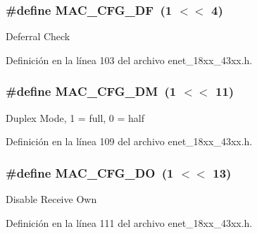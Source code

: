 \subsubsection[{\texorpdfstring{M\+A\+C\+\_\+\+C\+F\+G\+\_\+\+DF}{MAC_CFG_DF}}]{\setlength{\rightskip}{0pt plus 5cm}\#define M\+A\+C\+\_\+\+C\+F\+G\+\_\+\+DF~(1 $<$$<$ 4)}\hypertarget{group___e_n_e_t__18_x_x__43_x_x_ga76e80594820118f47b7084cbcf46e82d}{}\label{group___e_n_e_t__18_x_x__43_x_x_ga76e80594820118f47b7084cbcf46e82d}
Deferral Check 

Definición en la línea 103 del archivo enet\+\_\+18xx\+\_\+43xx.\+h.

\subsubsection[{\texorpdfstring{M\+A\+C\+\_\+\+C\+F\+G\+\_\+\+DM}{MAC_CFG_DM}}]{\setlength{\rightskip}{0pt plus 5cm}\#define M\+A\+C\+\_\+\+C\+F\+G\+\_\+\+DM~(1 $<$$<$ 11)}\hypertarget{group___e_n_e_t__18_x_x__43_x_x_ga88f18b0bf9c694534e3616971de33f74}{}\label{group___e_n_e_t__18_x_x__43_x_x_ga88f18b0bf9c694534e3616971de33f74}
Duplex Mode, 1 = full, 0 = half 

Definición en la línea 109 del archivo enet\+\_\+18xx\+\_\+43xx.\+h.

\subsubsection[{\texorpdfstring{M\+A\+C\+\_\+\+C\+F\+G\+\_\+\+DO}{MAC_CFG_DO}}]{\setlength{\rightskip}{0pt plus 5cm}\#define M\+A\+C\+\_\+\+C\+F\+G\+\_\+\+DO~(1 $<$$<$ 13)}\hypertarget{group___e_n_e_t__18_x_x__43_x_x_gaee61760c1d9f16418075db2cc35183ce}{}\label{group___e_n_e_t__18_x_x__43_x_x_gaee61760c1d9f16418075db2cc35183ce}
Disable Receive Own 

Definición en la línea 111 del archivo enet\+\_\+18xx\+\_\+43xx.\+h.

